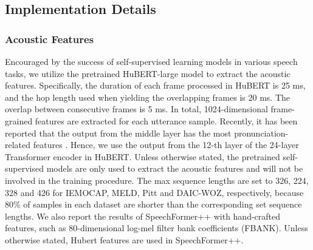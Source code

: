 \documentclass[lettersize,journal]{IEEEtran}
\begin{document}
\subsection{Implementation Details}
\subsubsection{Acoustic Features} Encouraged by the success of self-supervised learning models in various speech tasks, we utilize the pretrained HuBERT-large \cite{hubert} model to extract the acoustic features. Specifically, the duration of each frame processed in HuBERT is 25 ms, and the hop length used when yielding the overlapping frames is 20 ms. The overlap between consecutive frames is 5 ms. In total, 1024-dimensional frame-grained features are extracted for each utterance sample. Recently, it has been reported that the output from the middle layer has the most pronunciation-related features \cite{12layer}. Hence, we use the output from the 12-th layer of the 24-layer Transformer encoder in HuBERT. Unless otherwise stated, the pretrained self-supervised models are only used to extract the acoustic features and will not be involved in the training procedure. The max sequence lengths are set to 326, 224, 328 and 426 for IEMOCAP, MELD, Pitt and DAIC-WOZ, respectively, because 80\% of samples in each dataset are shorter than the corresponding set sequence lengths. We also report the results of SpeechFormer++ with hand-crafted features, such as 80-dimensional log-mel filter bank coefficients (FBANK). Unless otherwise stated, Hubert features are used in SpeechFormer++.

\begin{table}[t]
    \caption{Performance and computational efficiency of Transformer and SpeechFormer++ using HuBERT features on IEMOCAP. Gain indicates the relative improvement (+) or reduction (-)}
    \label{tab_1}
    \centering
\end{table}
\end{document}
